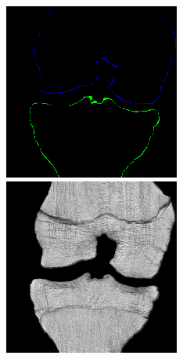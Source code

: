 \begin{figure}[H]
\endminipage\hfill
{}%
  \includegraphics[width=\linewidth]{imgs/c1.png}
\endminipage\hfill
{}%
  \includegraphics[width=\linewidth]{imgs/d1.png}

\end{figure}
